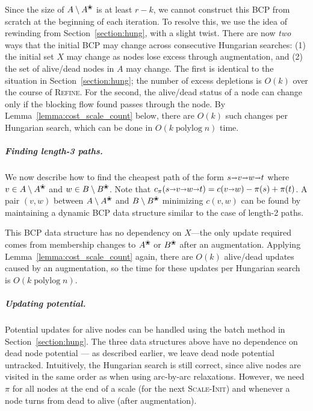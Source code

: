 \documentclass[a4paper,UKenglish]{socg-lipics-v2019}
\makeatletter
\def\polylog{\mathop{\mathrm{polylog}}}
\def\arcto{\mathord\shortrightarrow}
\def\arc#1#2{#1\arcto#2}
\def\alive#1{{#1}^\text{\ding{96}}}
\def\dead#1{{#1} \setminus \alive{#1}}
\theoremstyle{plain}
\numberwithin{figure}{section}
\renewcommand{\paragraph}{\subparagraph}
\def\n@te#1{\textsf{\boldmath \textbf{$\langle\!\langle$#1$\rangle\!\rangle$}}\leavevmode}
\def\note#1{\textcolor{red}{\n@te{#1}}}
\makeatother
\begin{document}
Since the size of $\dead{A}$ is at least $r-k$, we cannot
construct this BCP from scratch at the beginning of each iteration.
To resolve this, we use the idea of rewinding from Section~\ref{section:hung},
with a slight twist.
There are now \emph{two} ways that the initial BCP may change across
consecutive Hungarian searches: (1) the initial set $X$ may change as nodes
lose excess through augmentation, and (2) the set of alive/dead nodes in $A$ may
change.
The first is identical to the situation in Section~\ref{section:hung};
the number of excess depletions is $O(k)$ over the course of \textsc{Refine}.
For the second, the alive/dead status of a node can change only if the
blocking flow found passes through the node.
By Lemma~\ref{lemma:cost_scale_count} below, there are $O(k)$ such changes per Hungarian search,
which can be done in $O(k\polylog n)$ time.

\paragraph{Finding length-3 paths.}
We now describe how to find the cheapest path of the form $s \arcto v \arcto w \arcto t$
where $v \in \dead{A}$ and $w \in \dead{B}$.
Note that $c_\pi(s \arcto v \arcto w \arcto t) = c(\arc vw) - \pi(s) + \pi(t)$.
A pair $(v, w)$ between $\dead{A}$ and $\dead{B}$ minimizing $c(v, w)$
can be found by maintaining a dynamic BCP data structure similar to the
case of length-2 paths.

This BCP data structure has no dependency on $X$---the only update required comes from
membership changes to $\alive{A}$ or $\alive{B}$ after an augmentation.
Applying Lemma~\ref{lemma:cost_scale_count} again,
there are $O(k)$ alive/dead updates caused by an augmentation, so the time for
these updates per Hungarian search is $O(k\polylog n)$.

\paragraph{Updating potential.}
Potential updates for alive nodes can be handled using the batch method in Section~\ref{section:hung}.
The three data structures above have no dependence on dead node potential ---
as described earlier, we leave dead node potential untracked.
Intuitively, the Hungarian search is still correct, since alive nodes are visited
in the same order as when using arc-by-arc relaxations.
However, we need $\pi$ for all nodes at the end of a scale (for the
next \textsc{Scale-Init}) and whenever a node turns from dead to alive
(after augmentation).
\end{document}
